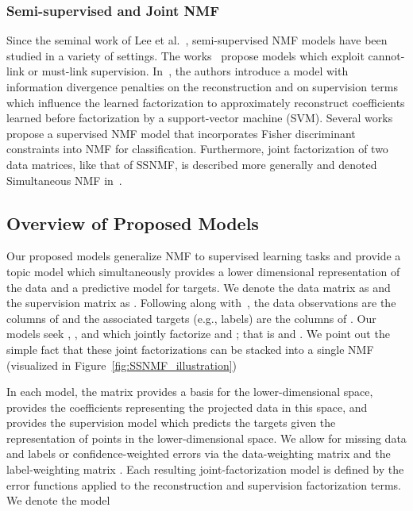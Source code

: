 \documentclass[twocolumn,10pt]{article}
\begin{document}
\subsubsection*{Semi-supervised and Joint NMF}
Since the seminal work of Lee et al.~\cite{lee2009semi}, semi-supervised NMF models have been studied in a variety of settings. The works~\cite{chen2008non, fei2008semi,jia2019semi} propose models which exploit cannot-link or must-link supervision.  In~\cite{cho2011nonnegative}, the authors introduce a model with information divergence penalties on the reconstruction and on supervision terms which influence the learned factorization to approximately reconstruct coefficients learned before factorization by a support-vector machine (SVM).
Several works~\cite{jia2004fisher,xue2006modified,zafeiriou2006exploiting} propose a supervised NMF model that incorporates Fisher discriminant constraints into NMF for classification.  
Furthermore, joint factorization of two data matrices, like that of SSNMF, is described more generally and denoted Simultaneous NMF in~\cite{cichocki2009nonnegative}.


\subsection{Overview of Proposed Models}\label{sec:overview}
Our proposed models generalize NMF to supervised learning tasks
and provide a topic model which simultaneously provides a lower dimensional representation of the data and a predictive model for targets. 
We denote the data matrix as  and the supervision matrix as . Following along with~\cite{lee2009semi}, the data observations are the columns of  and the associated targets (e.g., labels) are the columns of .  Our models seek , , and  which jointly factorize  and ; that is  and .  We point out the simple fact that these joint factorizations can be stacked into a single NMF (visualized in Figure~\ref{fig:SSNMF_illustration})

In each model, the matrix  provides a basis for the lower-dimensional space,  provides the coefficients representing the projected data in this space, and  provides the supervision model which predicts the targets given the representation of points in the lower-dimensional space.  We allow for missing data and labels or confidence-weighted errors via the data-weighting matrix  and the label-weighting matrix . Each resulting joint-factorization model is defined by the error functions applied to the reconstruction and supervision factorization terms. We denote the model 
\end{document}
